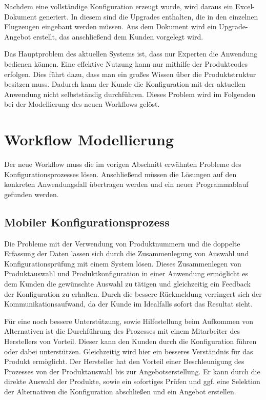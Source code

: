 Nachdem eine vollständige Konfiguration erzeugt wurde, wird daraus ein Excel-Dokument generiert. In diesem sind die Upgrades enthalten, die in den einzelnen Flugzeugen eingebaut werden müssen. Aus dem Dokument wird ein Upgrade-Angebot erstellt, das anschließend dem Kunden vorgelegt wird. \par 

Das Hauptproblem des aktuellen Systems ist, dass nur Experten die Anwendung bedienen können. Eine effektive Nutzung kann nur mithilfe der Produktcodes erfolgen. Dies führt dazu, dass man ein großes Wissen über die Produktstruktur besitzen muss. Dadurch kann der Kunde die Konfiguration mit der aktuellen Anwendung nicht selbstständig durchführen. Dieses Problem wird im Folgenden bei der Modellierung des neuen Workflows gelöst.

\section{Workflow Modellierung}\label{workflow_modelling}
Der neue Workflow muss die im vorigen Abschnitt erwähnten Probleme des Konfigurationsprozesses lösen.  Anschließend müssen die Lösungen auf den konkreten Anwendungsfall übertragen werden und ein neuer Programmablauf gefunden werden.

\subsection{Mobiler Konfigurationsprozess}\label{mobileConfiguration}
Die Probleme mit der Verwendung von Produktnummern und die doppelte Erfassung der Daten lassen sich durch die Zusammenlegung von Auswahl und Konfigurationsprüfung mit einem System lösen. Dieses Zusammenlegen von Produktauswahl und Produktkonfiguration in einer Anwendung ermöglicht es dem Kunden die gewünschte Auswahl zu tätigen und gleichzeitig ein Feedback der Konfiguration zu erhalten. Durch die bessere Rückmeldung verringert sich der Kommunikationsaufwand, da der Kunde im Idealfalls sofort das Resultat sieht. \par 
 Für eine noch bessere Unterstützung, sowie Hilfestellung beim Aufkommen von Alternativen ist die Durchführung des Prozesses mit einem Mitarbeiter des Herstellers von Vorteil. Dieser kann den Kunden durch die Konfiguration führen oder dabei unterstützen. Gleichzeitig wird hier ein besseres Verständnis für das Produkt ermöglicht. Der Hersteller hat den Vorteil einer Beschleunigung des Prozesses von der Produktauswahl bis zur Angebotserstellung. Er kann durch die direkte Auswahl der Produkte, sowie ein sofortiges Prüfen und ggf. eine Selektion der Alternativen die Konfiguration abschließen und ein  Angebot erstellen. \par 
 
